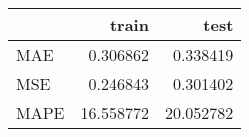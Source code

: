 \begin{tabular}{lrr}
\toprule
{} &      train &       test \\
\midrule
MAE  &   0.306862 &   0.338419 \\
MSE  &   0.246843 &   0.301402 \\
MAPE &  16.558772 &  20.052782 \\
\bottomrule
\end{tabular}
